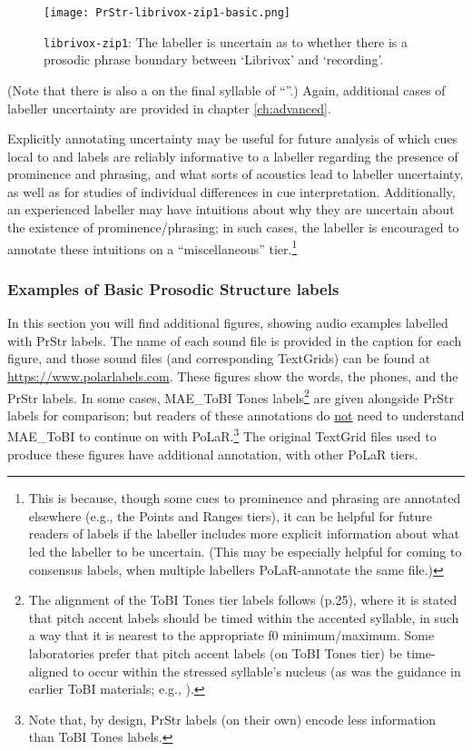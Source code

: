 \begin{figure}[H]
\centering
%
\texttt{[image: PrStr-librivox-zip1-basic.png]}
%
\caption{\texttt{librivox-zip1}: The labeller is uncertain as to whether there is a prosodic phrase boundary between ‘Librivox’ and ‘recording’.%
\label{fig:librivox-zip1 PrStr uncertainty}%
}
\end{figure}

(Note that there is also a  on the final syllable of “”.) Again, additional cases of labeller uncertainty are provided in chapter \ref{ch:advanced}.

Explicitly annotating uncertainty may be useful for future analysis of which cues local to \textlabel{*} and \textlabel{]} labels are reliably informative to a labeller regarding the presence of prominence and phrasing, and what sorts of acoustics lead to labeller uncertainty, as well as for studies of individual differences in cue interpretation. Additionally, an experienced labeller may have intuitions about why they are uncertain about the existence of prominence\slash phrasing; in such cases, the labeller is encouraged to annotate these intuitions on a “miscellaneous” tier.\footnote{This is because, though some cues to prominence and phrasing are annotated elsewhere (e.g., the Points and Ranges tiers), it can be helpful for future readers of labels if the labeller includes more explicit information about what led the labeller to be uncertain. (This may be especially helpful for coming to consensus labels, when multiple labellers PoLaR-annotate the same file.)}

\subsubsection{Examples of Basic Prosodic Structure labels}\label{sec:more-examples}

In this section you will find additional figures, showing audio examples labelled with PrStr labels. The name of each sound file is provided in the caption for each figure, and those sound files (and corresponding TextGrids) can be found at \url{https://www.polarlabels.com}. These figures show the words, the phones, and the PrStr labels. In some cases, MAE\_ToBI Tones labels\footnote{The alignment of the ToBI Tones tier labels follows \citealt{beckman-05} (p.25), where it is stated that pitch accent labels should be timed within the accented syllable, in such a way that it is nearest to the appropriate f0 minimum\slash maximum. Some laboratories prefer that pitch accent labels (on ToBI Tones tier) be time-aligned to occur within the stressed syllable’s nucleus (as was the guidance in earlier ToBI materials; e.g., \citealt{beckmanhirschberg94}).} are given alongside PrStr labels for comparison; but readers of these annotations do \uline{not} need to understand MAE\_ToBI to continue on with PoLaR.\footnote{Note that, by design, PrStr labels (on their own) encode less information than ToBI Tones labels.} The original TextGrid files used to produce these figures have additional annotation, with other PoLaR tiers.

